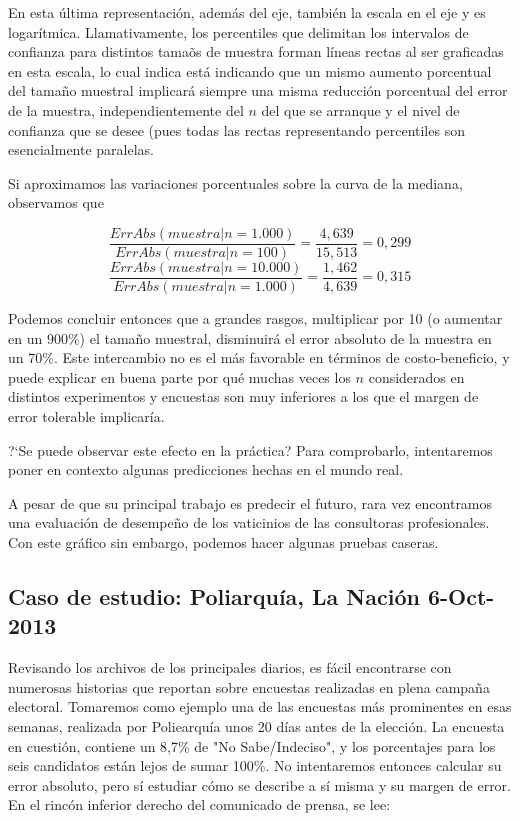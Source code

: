 \documentclass[12pt, a4paper]{article}
\begin{document}
En esta \'ultima representaci\'on, adem\'as del eje, tambi\'en la escala en el eje y es logar\'itmica. Llamativamente, los percentiles que delimitan los intervalos de confianza para distintos tama\~os de muestra forman l\'ineas rectas al ser graficadas en esta escala, lo cual indica est\'a indicando que un mismo aumento porcentual del tama\~no muestral implicar\'a siempre una misma reducci\'on porcentual del error de la muestra, independientemente del $n$ del que se arranque y el nivel de confianza que se desee (pues todas las rectas representando percentiles son esencialmente paralelas.

Si aproximamos las variaciones porcentuales sobre la curva de la mediana, observamos que 

$$ \frac{ErrAbs(muestra| n= 1.000)}{ErrAbs(muestra| n= 100)} = \frac{4,639}{15,513} = 0,299 $$
$$ \frac{ErrAbs(muestra| n= 10.000)}{ErrAbs(muestra| n= 1.000)} = \frac{1,462}{4,639} = 0,315 $$

Podemos concluir entonces que a grandes rasgos, multiplicar por 10 (o aumentar en un 900\%) el tama\~no muestral, disminuir\'a el error absoluto de la muestra en un 70\%. Este intercambio no es el m\'as favorable en t\'erminos de costo-beneficio, y puede explicar en buena parte por qu\'e muchas veces los $n$ considerados en distintos experimentos y encuestas son muy inferiores a los que el margen de error tolerable implicar\'ia.

?`Se puede observar este efecto en la pr\'actica? Para comprobarlo, intentaremos poner en contexto algunas predicciones hechas en el mundo real.

A pesar de que su principal trabajo es predecir el futuro, rara vez encontramos una evaluaci\'on de desempe\~no de los vaticinios de las consultoras profesionales. Con este gr\'afico sin embargo, podemos hacer algunas pruebas caseras.

\subsection{Caso de estudio: Poliarqu\'ia, La Naci\'on 6-Oct-2013}

Revisando los archivos de los principales diarios, es f\'acil encontrarse con numerosas historias que reportan sobre encuestas realizadas en plena campa\~na electoral. Tomaremos como ejemplo una de las encuestas m\'as prominentes en esas semanas, realizada por Poliearqu\'ia unos 20 d\'ias antes de la elecci\'on. La encuesta en cuesti\'on, contiene un 8,7\% de "No Sabe/Indeciso", y los porcentajes para los seis candidatos est\'an lejos de sumar 100\%. No intentaremos entonces calcular su error absoluto, pero s\'i estudiar c\'omo se describe a s\'i misma y su margen de error. En el rinc\'on inferior derecho del comunicado de prensa, se lee:
\end{document}
